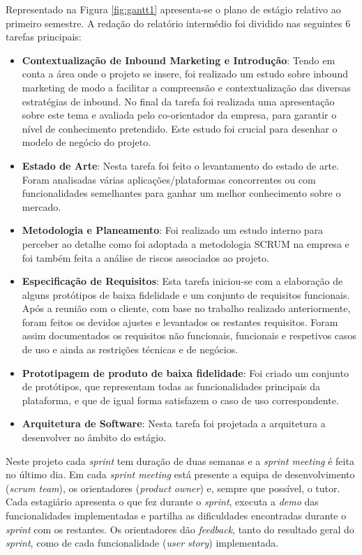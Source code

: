 Representado na Figura \ref{fig:gantt1} apresenta-se o plano de estágio relativo ao primeiro semestre. A redação do relatório intermédio foi dividido nas seguintes 6 tarefas principais:
\begin{itemize}
	\item \textbf{Contextualização de Inbound Marketing e Introdução}: Tendo em conta a área onde o projeto se insere, foi realizado um estudo sobre inbound marketing de modo a  facilitar a compreensão e contextualização das diversas estratégias de inbound. No final da tarefa foi realizada uma apresentação sobre este tema e avaliada pelo co-orientador da empresa, para garantir o nível de conhecimento pretendido. Este estudo foi crucial para desenhar o modelo de negócio do projeto.
	\item \textbf{Estado de Arte}: Nesta tarefa foi feito o levantamento do estado de arte. Foram analisadas várias aplicações/plataformas concorrentes ou com funcionalidades semelhantes para ganhar um melhor conhecimento sobre o mercado.
	\item \textbf{Metodologia e Planeamento}: Foi realizado um estudo interno para perceber ao detalhe como foi adoptada a metodologia SCRUM na empresa e foi também feita a análise de riscos associados ao projeto.
	\item \textbf{Especificação de Requisitos}: Esta tarefa iniciou-se com a elaboração de alguns protótipos de baixa fidelidade e um conjunto de requisitos funcionais. Após a reunião com o cliente, com base no trabalho realizado anteriormente, foram feitos os devidos ajustes e levantados os restantes requisitos. Foram assim documentados os requisitos não funcionais, funcionais e respetivos casos de uso e ainda as restrições técnicas e de negócios.
	\item \textbf{Prototipagem de produto de baixa fidelidade}: Foi criado um conjunto de protótipos, que representam todas as funcionalidades principais da plataforma, e que de igual forma satisfazem o caso de uso correspondente.
	\item \textbf{Arquitetura de Software}: Nesta tarefa foi projetada a arquitetura a desenvolver no âmbito do estágio.
\end{itemize}

Neste projeto cada \textit{sprint} tem duração de duas semanas e a \textit{sprint meeting} é feita no último dia. Em cada\textit{ sprint meeting }está presente a equipa de desenvolvimento (\textit{scrum team}), os orientadores (\textit{product owner}) e, sempre que possível, o tutor. Cada estagiário apresenta o que fez durante o \textit{sprint}, executa a \textit{demo} das funcionalidades implementadas e partilha as dificuldades encontradas durante o \textit{sprint }com os restantes. Os orientadores dão \textit{feedback}, tanto do resultado geral do \textit{sprint}, como de cada funcionalidade (\textit{user story}) implementada.


